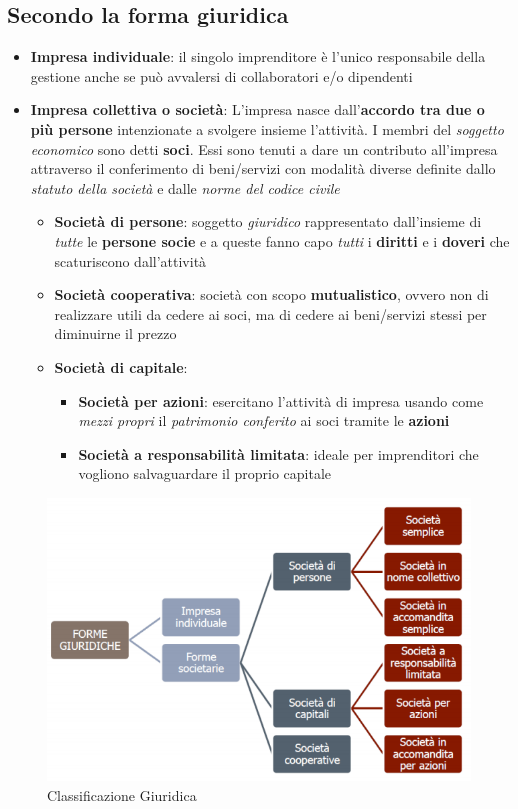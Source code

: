 \documentclass[12pt]{article}
\begin{document}
\subsection{Secondo la forma giuridica}
\begin{itemize}
    \item \textbf{Impresa individuale}: il singolo imprenditore è l'unico responsabile della gestione anche se può avvalersi di collaboratori e/o dipendenti
    \item \textbf{Impresa collettiva o società}: L'impresa nasce dall'\textbf{accordo tra due o più persone} intenzionate a svolgere insieme l'attività. I membri del \textit{soggetto economico} sono detti \textbf{soci}. Essi sono tenuti a dare un contributo all'impresa attraverso il conferimento di beni/servizi con modalità diverse definite dallo \textit{statuto della società} e dalle \textit{norme del codice civile}
          \begin{itemize}
              \item \textbf{Società di persone}: soggetto \textit{giuridico} rappresentato dall'insieme di \textit{tutte} le \textbf{persone socie} e a queste fanno capo \textit{tutti} i \textbf{diritti} e i \textbf{doveri} che scaturiscono dall'attività
              \item \textbf{Società cooperativa}: società con scopo \textbf{mutualistico}, ovvero non di realizzare utili da cedere ai soci, ma di cedere ai beni/servizi stessi per diminuirne il prezzo
              \item \textbf{Società di capitale}:
                    \begin{itemize}
                        \item \textbf{Società per azioni}: esercitano l'attività di impresa usando come \textit{mezzi propri} il \textit{patrimonio conferito} ai soci tramite le \textbf{azioni}
                        \item \textbf{Società a responsabilità limitata}: ideale per imprenditori che vogliono salvaguardare il proprio capitale
                    \end{itemize}
          \end{itemize}
\end{itemize}
\begin{figure}[!htb]
    \centering
    \includegraphics[width=1\textwidth]{images/giuridica.png}
    \caption{Classificazione Giuridica}
\end{figure}
\FloatBarrier
\end{document}
